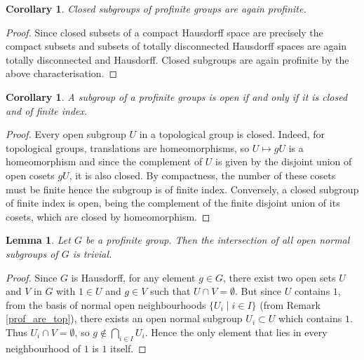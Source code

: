 \documentclass{article}
\theoremstyle{plain}
\newtheorem{lemma}[theorem]{Lemma}
\newtheorem{corollary}[theorem]{Corollary}
\theoremstyle{definition}
\begin{document}
\begin{corollary}
\label{closed_profinite_subgroup}
    Closed subgroups of profinite groups are again profinite.
\end{corollary}
\begin{proof}
    Since closed subsets of a compact Hausdorff space are precisely the compact subsets and subsets of totally disconnected Hausdorff spaces are again totally disconnected and Hausdorff. Closed subgroups are again profinite by the above characterisation.
\end{proof}

\begin{corollary}
\label{open_subgroup_profinite}
    A subgroup of a profinite groups is open if and only if it is closed and of finite index.
\end{corollary}
\begin{proof}
    Every open subgroup $U$ in a topological group is closed. Indeed, for topological groups, translations are homeomorphisms, so $U\mapsto gU$ is a homeomorphism and since the complement of $U$ is given by the disjoint union of open cosets $gU$, it is also closed. 
    By compactness, the number of these cosets must be finite hence the subgroup is of finite index.
    Conversely, a closed subgroup of finite index is open, being the complement of the finite disjoint union of its cosets, which are closed by homeomorphism.
\end{proof}

\begin{lemma}
\label{trivial_intersection_normal_subgroups}
    Let $G$ be a profinite group. 
    Then the intersection of all open normal subgroups of $G$ is trivial.
\end{lemma}
\begin{proof}
    Since $G$ is Hausdorff, for any element $g\in G$, there exist two open sets $U$ and $V$ in $G$ with $1\in U$ and $g\in V$ such that $U\cap V = \emptyset$.
    But since $U$ contains $1$, from the basis of normal open neighbourhoods $\{U_i\mid i\in I\}$ (from Remark \ref{prof_are_top}), there exists an open normal subgroup $U_i\subset U$ which contains $1$.
    Thus $U_i\cap V=\emptyset$, so $g\notin \bigcap_{i\in I}U_i$.
    Hence the only element that lies in every neighbourhood of $1$ is $1$ itself.
\end{proof}
\end{document}
